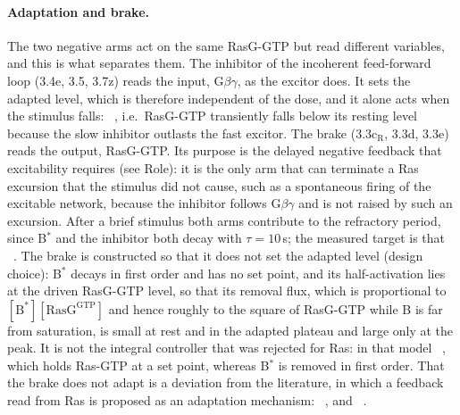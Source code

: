 \paragraph{Adaptation and brake.}
The two negative arms act on the same RasG-GTP but read different variables, and this is what separates them.
The inhibitor of the incoherent feed-forward loop (3.4e, 3.5, 3.7z) reads the input, G$\beta\gamma$, as the excitor does.
It sets the adapted level, which is therefore independent of the dose, and it alone acts when the stimulus falls: ~\cite{takeda2012}, i.e.\ RasG-GTP transiently falls below its resting level because the slow inhibitor outlasts the fast excitor.
The brake (3.3c$_\mathrm{R}$, 3.3d, 3.3e) reads the output, RasG-GTP.
Its purpose is the delayed negative feedback that excitability requires (see Role): it is the only arm that can terminate a Ras excursion that the stimulus did not cause, such as a spontaneous firing of the excitable network, because the inhibitor follows G$\beta\gamma$ and is not raised by such an excursion.
After a brief stimulus both arms contribute to the refractory period, since B$^*$ and the inhibitor both decay with $\tau=10$\,s; the measured target is that ~\cite{artemenko2016}.
The brake is constructed so that it does not set the adapted level (design choice): B$^*$ decays in first order and has no set point, and its half-activation lies at the driven RasG-GTP level, so that its removal flux, which is proportional to $[\mathrm{B}^*][\mathrm{RasG^{GTP}}]$ and hence roughly to the square of RasG-GTP while B is far from saturation, is small at rest and in the adapted plateau and large only at the peak.
It is not the integral controller that was rejected for Ras: in that model ~\cite[Suppl.\ Information]{takeda2012}, which holds Ras-GTP at a set point, whereas B$^*$ is removed in first order.
That the brake does not adapt is a deviation from the literature, in which a feedback read from Ras is proposed as an adaptation mechanism: ~\cite{xu2022}, and ~\cite{xu2022}.
